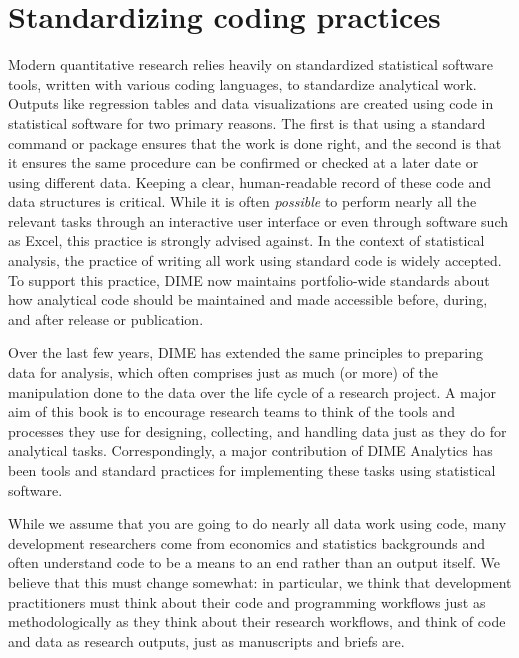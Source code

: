 \documentclass[
]{book}
\begin{document}
\hypertarget{standardizing-coding-practices}{%
\section*{Standardizing coding practices}\label{standardizing-coding-practices}}

Modern quantitative research relies heavily
on standardized statistical software tools,
written with various coding languages, to standardize analytical work.
Outputs like regression tables and data visualizations
are created using code in statistical software for two primary reasons.
The first is that using a standard command or package ensures that the work is done right,
and the second is that it ensures the same procedure can be confirmed or checked
at a later date or using different data.
Keeping a clear, human-readable record of these code and data structures is critical.
While it is often \emph{possible} to perform nearly all the relevant tasks
through an interactive user interface or even through software such as Excel,
this practice is strongly advised against.
In the context of statistical analysis,
the practice of writing all work using standard code is widely accepted.
To support this practice, DIME now maintains portfolio-wide standards
about how analytical code should be maintained and made accessible
before, during, and after release or publication.

Over the last few years, DIME has extended the same principles to preparing data for analysis,
which often comprises just as much (or more) of the manipulation done to the data
over the life cycle of a research project.
A major aim of this book is to encourage research teams
to think of the tools and processes they use
for designing, collecting, and handling data
just as they do for analytical tasks.
Correspondingly, a major contribution of DIME Analytics
has been tools and standard practices
for implementing these tasks using statistical software.

While we assume that you are going to do nearly all data work using code,
many development researchers come from economics and statistics backgrounds
and often understand code to be a means to an end rather than an output itself.
We believe that this must change somewhat:
in particular, we think that development practitioners
must think about their code and programming workflows
just as methodologically as they think about their research workflows,
and think of code and data as research outputs, just as manuscripts and briefs are.
\end{document}
